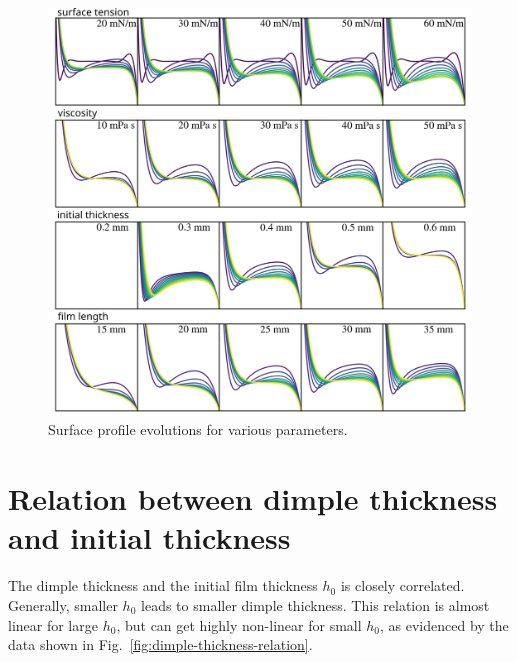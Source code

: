 \documentclass[aps,pre,onecolumn,superscriptaddress,notitlepage,10pt]{revtex4-2}
\begin{document}
\begin{figure}[ht]
    \centering
    \includegraphics[width=\linewidth]{Figures/all_parameter_effects.png}
    \caption{
    Surface profile evolutions for various parameters.
    }
    \label{fig:all-parameters-influence}
\end{figure}

\newpage

\section{Relation between dimple thickness and initial thickness}

The dimple thickness and the initial film thickness $h_0$ is closely correlated. 
Generally, smaller $h_0$ leads to smaller dimple thickness. 
This relation is almost linear for large $h_0$, but can get highly non-linear for small $h_0$, as evidenced by the data shown in Fig.~\ref{fig:dimple-thickness-relation}.
\end{document}
